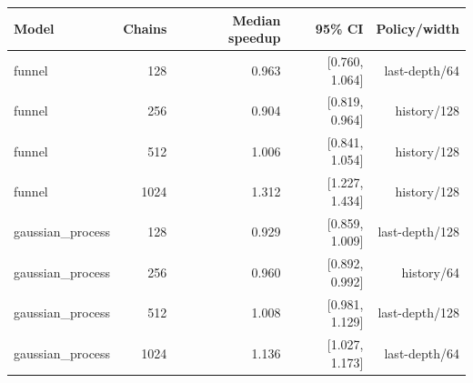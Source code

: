\begin{tabular}{lrrrr}
\toprule
Model & Chains & Median speedup & 95\% CI & Policy/width \\
\midrule
funnel & 128 & 0.963 & [0.760, 1.064] & last-depth/64 \\
funnel & 256 & 0.904 & [0.819, 0.964] & history/128 \\
funnel & 512 & 1.006 & [0.841, 1.054] & history/128 \\
funnel & 1024 & 1.312 & [1.227, 1.434] & history/128 \\
gaussian\_process & 128 & 0.929 & [0.859, 1.009] & last-depth/128 \\
gaussian\_process & 256 & 0.960 & [0.892, 0.992] & history/64 \\
gaussian\_process & 512 & 1.008 & [0.981, 1.129] & last-depth/128 \\
gaussian\_process & 1024 & 1.136 & [1.027, 1.173] & last-depth/64 \\
\bottomrule
\end{tabular}
